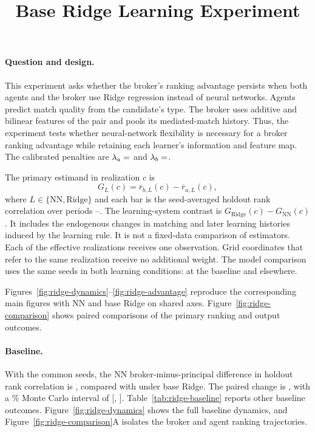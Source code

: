 \documentclass[11pt]{article}
\title{Base Ridge Learning Experiment}
\author{}
\date{}
\begin{document}
\maketitle
\renewcommand{\thefigure}{R\arabic{figure}}
\renewcommand{\thetable}{R\arabic{table}}

\paragraph{Question and design.}
This experiment asks whether the broker's ranking advantage persists when both
agents and the broker use Ridge regression instead of neural networks. Agents
predict match quality from the candidate's type. The broker uses additive and
bilinear features of the pair and pools its mediated-match history. Thus, the
experiment tests whether neural-network flexibility is necessary for a broker
ranking advantage while retaining each learner's information and feature map.
The calibrated penalties are $\lambda_a=\rv{ridgeLambdaAgent}$ and
$\lambda_b=\rv{ridgeLambdaBroker}$.

The primary estimand in realization $c$ is
\[
G_L(c)=\overline{r}_{b,L}(c)-\overline{r}_{a,L}(c),
\]
where $L\in\{\mathrm{NN},\mathrm{Ridge}\}$ and each bar is the seed-averaged
holdout rank correlation over periods --.
The learning-system contrast is
$G_{\mathrm{Ridge}}(c)-G_{\mathrm{NN}}(c)$. It includes the endogenous changes
in matching and later learning histories induced by the learning rule. It is
not a fixed-data comparison of estimators. Each of the
 effective realizations receives one observation. Grid
coordinates that refer to the same realization receive no additional weight.
The model comparison uses the same seeds in both learning conditions:
 at the baseline and  elsewhere.

Figures~\ref{fig:ridge-dynamics}--\ref{fig:ridge-advantage} reproduce the
corresponding main figures with NN and base Ridge on shared axes.
Figure~\ref{fig:ridge-comparison} shows paired comparisons of the primary
ranking and output outcomes.

\paragraph{Baseline.}
With the common seeds, the NN broker-minus-principal difference in holdout rank
correlation is , compared with
 under base Ridge. The paired change is
, with a \% Monte Carlo interval of
[, ].
Table~\ref{tab:ridge-baseline} reports other baseline outcomes.
Figure~\ref{fig:ridge-dynamics} shows the full baseline dynamics, and
Figure~\ref{fig:ridge-comparison}A isolates the broker and agent ranking trajectories.
\end{document}

